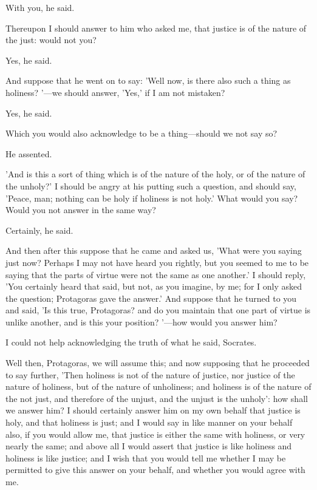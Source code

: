 \documentclass[11pt,letter]{article}
\begin{document}
\par  With you, he said.

\par  Thereupon I should answer to him who asked me, that justice is of the nature of the just: would not you?

\par  Yes, he said.

\par  And suppose that he went on to say: 'Well now, is there also such a thing as holiness? '—we should answer, 'Yes,' if I am not mistaken?

\par  Yes, he said.

\par  Which you would also acknowledge to be a thing—should we not say so?

\par  He assented.

\par  'And is this a sort of thing which is of the nature of the holy, or of the nature of the unholy?' I should be angry at his putting such a question, and should say, 'Peace, man; nothing can be holy if holiness is not holy.' What would you say? Would you not answer in the same way?

\par  Certainly, he said.

\par  And then after this suppose that he came and asked us, 'What were you saying just now? Perhaps I may not have heard you rightly, but you seemed to me to be saying that the parts of virtue were not the same as one another.' I should reply, 'You certainly heard that said, but not, as you imagine, by me; for I only asked the question; Protagoras gave the answer.' And suppose that he turned to you and said, 'Is this true, Protagoras? and do you maintain that one part of virtue is unlike another, and is this your position? '—how would you answer him?

\par  I could not help acknowledging the truth of what he said, Socrates.

\par  Well then, Protagoras, we will assume this; and now supposing that he proceeded to say further, 'Then holiness is not of the nature of justice, nor justice of the nature of holiness, but of the nature of unholiness; and holiness is of the nature of the not just, and therefore of the unjust, and the unjust is the unholy': how shall we answer him? I should certainly answer him on my own behalf that justice is holy, and that holiness is just; and I would say in like manner on your behalf also, if you would allow me, that justice is either the same with holiness, or very nearly the same; and above all I would assert that justice is like holiness and holiness is like justice; and I wish that you would tell me whether I may be permitted to give this answer on your behalf, and whether you would agree with me.
\end{document}
